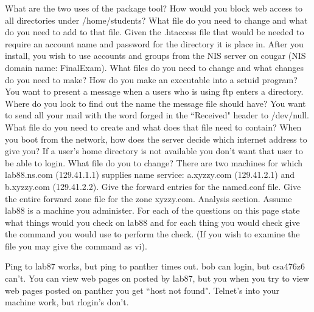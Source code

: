 \ques
What are the two uses of the package tool?
\vskip 1.2in
\ques
How would you block web access to all directories under {\ltt{}/home/students}?
What file do you need to change and what do you need to add to that file.
\vskip 2.2in
\ques
Given the {\ltt{}.htaccess} file that would be needed to require an
account name and password for the directory it is place in.
\vskip 2.8in
\vfill\eject
\ques
After you install, you wish to use accounts and groups from the NIS
server on {\ltt{}cougar} (NIS domain name: {\ltt{}FinalExam}).
What files do you need to change and what changes do you need to make?
\vskip 1.4in
\ques
How do you make an executable into a setuid program?
\vskip 1.0in
\ques
You want to present a message when a users who is using ftp enters a directory.
Where do you look to find out the name the message file should have?
\vskip 0.8in
\ques
You want to send all your mail with the word {\ltt{}forged} in the
``{\ltt{}Received}" header to {\ltt{}/dev/null}.
What file do you need to create and what does that file need to contain?
\vskip 1.6in
\vfill\eject
\ques
When you boot from the network, how does the server decide which internet
address to give you?
\vskip 1.6in
\ques
If a user's home directory is not available you don't want that user to be
able to login.
What file do you to change?
\vskip 0.8in
\ques
There are two machines for which {\ltt{}lab88.ns.com} ({\ltt{}129.41.1.1})
supplies name service:
{\ltt{}a.xyzzy.com} ({\ltt{}129.41.2.1}) and 
{\ltt{}b.xyzzy.com} ({\ltt{}129.41.2.2}).
Give the forward entries for the  {\ltt{}named.conf} file.
\vskip 1.7in
\ques
Give the entire forward zone file for the zone {\ltt{}xyzzy.com}.
\vskip 3.5in
\vfill\eject
Analysis section. Assume {\ltt{}lab88} is a machine you administer.
For each of the questions on this page
state what things would you check on {\ltt{}lab88}
and for each thing you would check give the command you would use to
perform the check. (If you wish to examine the file you may give the
command as {\ltt{}vi}).

\ques
Ping to {\ltt{}lab87} works, but ping to {\ltt{}panther} times out.
\vfill
\ques
{\ltt{}bob} can login, but {\ltt{}csa476z6} can't.
\vfill
\ques
You can view web pages on posted by lab87, but you when you try to
view web pages posted on panther you get ``{\ltt{}host not found}".
\vfill
\ques
Telnet's into your machine work, but rlogin's don't.
\bye
